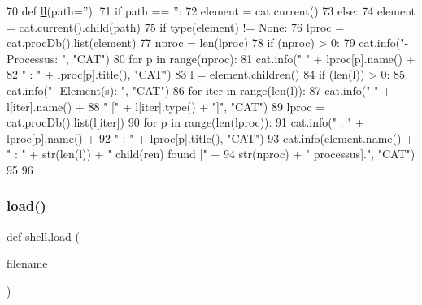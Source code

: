\begin{DoxyCode}
70 \textcolor{keyword}{def }\hyperlink{namespaceshell_a739d025c0779dd20066ec2f61b0513aa}{ll}(path=''):
71   \textcolor{keywordflow}{if} path == \textcolor{stringliteral}{''}:
72     element = cat.current()
73   \textcolor{keywordflow}{else}:
74     element = cat.current().child(path)
75   \textcolor{keywordflow}{if} type(element) != \textcolor{keywordtype}{None}:
76     lproc = cat.procDb().list(element)
77     nproc = len(lproc)
78     \textcolor{keywordflow}{if} (nproc) > 0:
79       cat.info(\textcolor{stringliteral}{"- Processus: "}, \textcolor{stringliteral}{"CAT"})
80     \textcolor{keywordflow}{for} p \textcolor{keywordflow}{in} range(nproc):
81       cat.info(\textcolor{stringliteral}{"    "} + lproc[p].name() +
82                \textcolor{stringliteral}{" : "} + lproc[p].title(), \textcolor{stringliteral}{"CAT"})
83     l = element.children()
84     \textcolor{keywordflow}{if} (len(l)) > 0:
85       cat.info(\textcolor{stringliteral}{"- Element(s): "}, \textcolor{stringliteral}{"CAT"})
86     \textcolor{keywordflow}{for} iter \textcolor{keywordflow}{in} range(len(l)):
87       cat.info(\textcolor{stringliteral}{"    "} + l[iter].name() +
88                \textcolor{stringliteral}{" ["} + l[iter].type() + \textcolor{stringliteral}{"]"}, \textcolor{stringliteral}{"CAT"})
89       lproc = cat.procDb().list(l[iter])
90       \textcolor{keywordflow}{for} p \textcolor{keywordflow}{in} range(len(lproc)):
91         cat.info(\textcolor{stringliteral}{"       . "} + lproc[p].name() +
92                  \textcolor{stringliteral}{" : "} + lproc[p].title(), \textcolor{stringliteral}{"CAT"})
93       cat.info(element.name() + \textcolor{stringliteral}{" :  "} + str(len(l)) + \textcolor{stringliteral}{" child(ren) found ["} +
94                str(nproc) + \textcolor{stringliteral}{" processus]."}, \textcolor{stringliteral}{"CAT"})
95 
96 
\end{DoxyCode}
\mbox{\label{namespaceshell_af9ea9dab4000d08fadcd5fed31b64911}} 
\subsubsection{\texorpdfstring{load()}{load()}}
{\footnotesize\ttfamily def shell.\+load (\begin{DoxyParamCaption}\item[{}]{filename }\end{DoxyParamCaption})}



